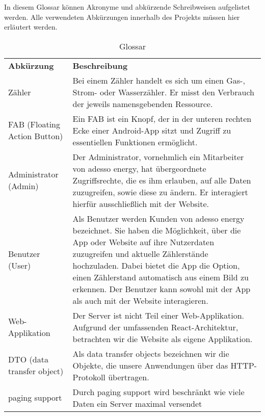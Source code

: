 \begin{tcolorbox}
In diesem Glossar können Akronyme und abkürzende Schreibweisen aufgelistet werden. 
Alle verwendeten Abkürzungen innerhalb des Projekts müssen hier erläutert werden.
\end{tcolorbox}

\begin{table}[h]
	\centering
	\begin{tabularx}{\textwidth}{X X}
		\rowcolor[HTML]{C0C0C0} 
		\textbf{Abkürzung} & \textbf{Beschreibung} \\
		Zähler & Bei einem Zähler handelt es sich um einen Gas-, Strom- oder Wasserzähler. Er misst den Verbrauch der jeweils namensgebenden Ressource. \\
		\rowcolor[HTML]{E7E7E7} 
		FAB (Floating Action Button) & Ein FAB ist ein Knopf, der in der unteren rechten Ecke einer Android-App sitzt und Zugriff zu essentiellen Funktionen ermöglicht. \\
		Administrator (Admin) & Der Administrator, vornehmlich ein Mitarbeiter von adesso energy, hat übergeordnete Zugriffsrechte, die es ihm erlauben, auf alle Daten zuzugreifen, sowie diese zu ändern. Er interagiert hierfür ausschließlich mit der Website. \\
		\rowcolor[HTML]{E7E7E7} 
		Benutzer (User) & Als Benutzer werden Kunden von adesso energy bezeichnet. Sie haben die Möglichkeit, über die App oder Website auf ihre Nutzerdaten zuzugreifen und aktuelle Zählerstände hochzuladen. Dabei bietet die App die Option, einen Zählerstand automatisch aus einem Bild zu erkennen. Der Benutzer kann sowohl mit der App als auch mit der Website interagieren. \\
		Web-Applikation & Der Server ist nicht Teil einer Web-Applikation. Aufgrund der umfassenden React-Architektur, betrachten wir die Website als eigene Applikation. \\
		\rowcolor[HTML]{E7E7E7} 
		DTO (data transfer object) & Als data transfer objects bezeichnen wir die Objekte, die unsere Anwendungen über das HTTP-Protokoll übertragen. \\
		paging support & Durch paging support wird beschränkt wie viele Daten ein Server maximal versendet \cite{}  
	\end{tabularx}
	\caption{Glossar}
	\label{table:glossar}
\end{table}